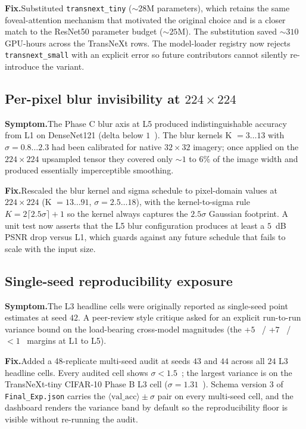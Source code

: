 \textbf{Fix.}\quad Substituted \texttt{transnext\_tiny} ($\sim 28$M
parameters), which retains the same foveal-attention mechanism that
motivated the original choice and is a closer match to the ResNet50
parameter budget ($\sim 25$M). The substitution saved $\sim 310$
GPU-hours across the TransNeXt rows. The model-loader registry now
rejects \texttt{transnext\_small} with an explicit error so future
contributors cannot silently re-introduce the variant.

\subsection{Per-pixel blur invisibility at $224 \times 224$}
\textbf{Symptom.}\quad The Phase C blur axis at L5 produced
indistinguishable accuracy from L1 on DenseNet121 (delta below
$1$~\Mpp{}). The blur kernels K $= 3 \ldots 13$ with $\sigma = 0.8 \ldots
2.3$ had been calibrated for native $32 \times 32$ imagery; once applied
on the $224 \times 224$ upsampled tensor they covered only $\sim 1$ to
$6\%$ of the image width and produced essentially imperceptible
smoothing.

\textbf{Fix.}\quad Rescaled the blur kernel and sigma schedule to
pixel-domain values at $224 \times 224$ (K $= 13 \ldots 91$,
$\sigma = 2.5 \ldots 18$), with the kernel-to-sigma rule
$K = 2 \lceil 2.5 \sigma \rceil + 1$ so the kernel always captures the
$2.5 \sigma$ Gaussian footprint. A unit test now asserts that the L5
blur configuration produces at least a $5$~dB PSNR drop versus L1, which
guards against any future schedule that fails to scale with the input
size.

\subsection{Single-seed reproducibility exposure}
\textbf{Symptom.}\quad The L3 headline cells were originally reported as
single-seed point estimates at seed $42$. A peer-review style critique
asked for an explicit run-to-run variance bound on the load-bearing
cross-model magnitudes (the +$5$~\Mpp{} / +$7$~\Mpp{} / $<1$~\Mpp{}
margins at L1 to L5).

\textbf{Fix.}\quad Added a 48-replicate multi-seed audit at seeds $43$
and $44$ across all $24$ L3 headline cells. Every audited cell shows
$\sigma < 1.5$~\Mpp{}; the largest variance is on the TransNeXt-tiny
CIFAR-10 Phase B L3 cell ($\sigma = 1.31$~\Mpp{}). Schema version 3 of
\texttt{Final\_Exp.json} carries the
$\langle\mathrm{val\_acc}\rangle \pm \sigma$ pair on every multi-seed
cell, and the dashboard renders the variance band by default so the
reproducibility floor is visible without re-running the audit.
